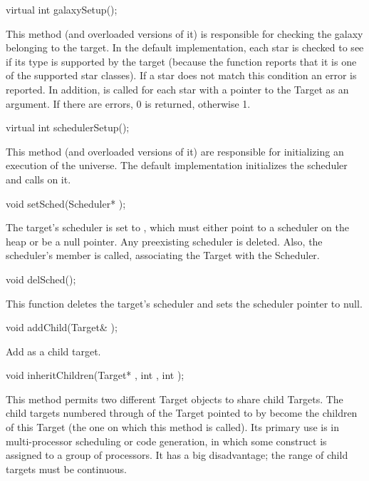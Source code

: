 \begin{example}
virtual int galaxySetup();
\end{example}

This method (and overloaded versions of it) is responsible for checking
the galaxy belonging to the target.  In the default implementation,
each star is checked to see if its type is
supported by the target (because the  function reports
that it is one of the supported star classes).  If a star does not
match this condition an error is reported.  In addition,
 is called for each star with a pointer to the Target
as an argument.  If there are errors, 0 is returned, otherwise 1.

\begin{example}
virtual int schedulerSetup();
\end{example}

This method (and overloaded versions of it) are responsible for
initializing an execution of the universe.  The default implementation
initializes the scheduler and calls  on it.

\begin{example}
void setSched(Scheduler* );
\end{example}

The target's scheduler is set to , which must either point to a
scheduler on the heap or be a null pointer.  Any preexisting scheduler
is deleted.  Also, the scheduler's  member is called,
associating the Target with the Scheduler.

\begin{example}
void delSched();
\end{example}

This function deletes the target's scheduler and sets the scheduler
pointer to null.

\begin{example}
void addChild(Target& );
\end{example}

Add  as a child target.

\begin{example}
void inheritChildren(Target* , int , int );
\end{example}

This method permits two different Target objects to share child Targets.
The child targets numbered  through  of the Target
pointed to by  become the children of this Target (the one
on which this method is called).  Its primary use is in multi-processor
scheduling or code generation, in which some construct is assigned to
a group of processors.  It has a big disadvantage; the range of child
targets must be continuous.

